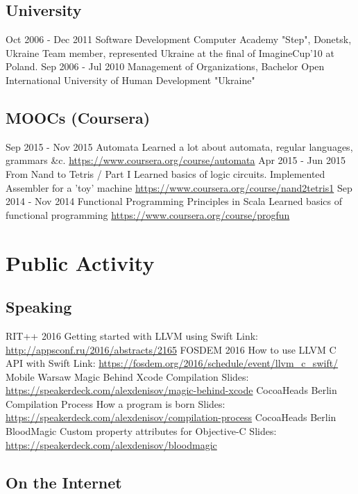 \documentclass[11pt,a4paper]{moderncv}
\begin{document}
  \subsection{University}
  \cventry
    {Oct 2006 - Dec 2011}
    {Software Development}
    {Computer Academy "Step", Donetsk, Ukraine}
    {}{}
    {Team member, represented Ukraine at the final of ImagineCup'10 at Poland.}
  \cventry
    {Sep 2006 - Jul 2010}
    {Management of Organizations, Bachelor}
    {Open International University of Human Development "Ukraine"}
    {}{}{}
  \subsection{MOOCs (Coursera)}
  \cventry
    {Sep 2015 - Nov 2015}
    {Automata}
    {\newline Learned a lot about automata, regular languages, grammars \&c.}
    {}{\newline\url{https://www.coursera.org/course/automata}}{}
  \cventry
    {Apr 2015 - Jun 2015}
    {From Nand to Tetris / Part I}
    {\newline Learned basics of logic circuits. Implemented Assembler for a 'toy' machine}
    {}{\newline\url{https://www.coursera.org/course/nand2tetris1}}{}
  \cventry
    {Sep 2014 - Nov 2014}
    {Functional Programming Principles in Scala}
    {\newline Learned basics of functional programming}
    {}{\newline\url{https://www.coursera.org/course/progfun}}{}

\section{Public Activity}
  \subsection{Speaking}
  \cventry
    {RIT++ 2016}
    {Getting started with LLVM using Swift}
    {}
    {}{}
    {Link: \url{http://appsconf.ru/2016/abstracts/2165}}
  \cventry
    {FOSDEM 2016}
    {How to use LLVM C API with Swift}
    {}
    {}{}
    {Link: \url{https://fosdem.org/2016/schedule/event/llvm_c_swift/}}
  \cventry
    {Mobile Warsaw}
    {Magic Behind Xcode}
    {Compilation}
    {}{}
    {Slides: \url{https://speakerdeck.com/alexdenisov/magic-behind-xcode}}
  \cventry
    {CocoaHeads Berlin}
    {Compilation Process}
    {How a program is born}
    {}{}
    {Slides: \url{https://speakerdeck.com/alexdenisov/compilation-process}}
  \cventry
    {CocoaHeads Berlin}
    {BloodMagic}
    {Custom property attributes for Objective-C}
    {}{}
    {Slides: \url{https://speakerdeck.com/alexdenisov/bloodmagic}}
  \subsection{On the Internet}
\end{document}
